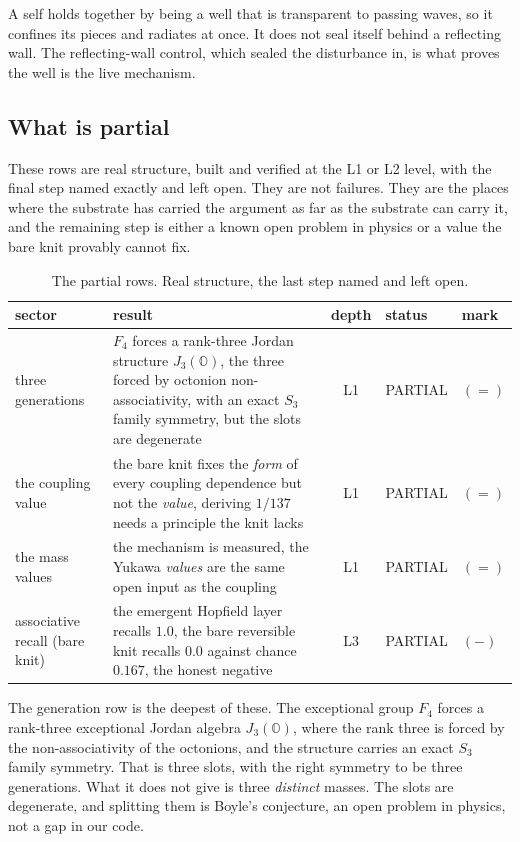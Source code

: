 \begin{principle}
A self holds together by being a well that is transparent to passing waves, so it confines its pieces and radiates at once. It does not seal itself behind a reflecting wall. The reflecting-wall control, which sealed the disturbance in, is what proves the well is the live mechanism.
\end{principle}

\subsection{What is partial}

These rows are real structure, built and verified at the L1 or L2 level, with the final step named exactly and left open. They are not failures. They are the places where the substrate has carried the argument as far as the substrate can carry it, and the remaining step is either a known open problem in physics or a value the bare knit provably cannot fix.

\begin{table}[ht]
\centering
\small
\begin{tabular}{@{}p{3.0cm}p{7.0cm}cll@{}}
\toprule
sector & result & depth & status & mark \\
\midrule
three generations & $F_4$ forces a rank-three Jordan structure $J_3(\mathbb{O})$, the three forced by octonion non-associativity, with an exact $S_3$ family symmetry, but the slots are degenerate & L1 & PARTIAL & $(=)$ \\
the coupling value & the bare knit fixes the \emph{form} of every coupling dependence but not the \emph{value}, deriving $1/137$ needs a principle the knit lacks & L1 & PARTIAL & $(=)$ \\
the mass values & the mechanism is measured, the Yukawa \emph{values} are the same open input as the coupling & L1 & PARTIAL & $(=)$ \\
associative recall (bare knit) & the emergent Hopfield layer recalls $1.0$, the bare reversible knit recalls $0.0$ against chance $0.167$, the honest negative & L3 & PARTIAL & $(-)$ \\
\bottomrule
\end{tabular}
\caption{The partial rows. Real structure, the last step named and left open.}
\label{tab:partial}
\end{table}

The generation row is the deepest of these. The exceptional group $F_4$ forces a rank-three exceptional Jordan algebra $J_3(\mathbb{O})$, where the rank three is forced by the non-associativity of the octonions, and the structure carries an exact $S_3$ family symmetry. That is three slots, with the right symmetry to be three generations. What it does not give is three \emph{distinct} masses. The slots are degenerate, and splitting them is Boyle's conjecture, an open problem in physics, not a gap in our code.

